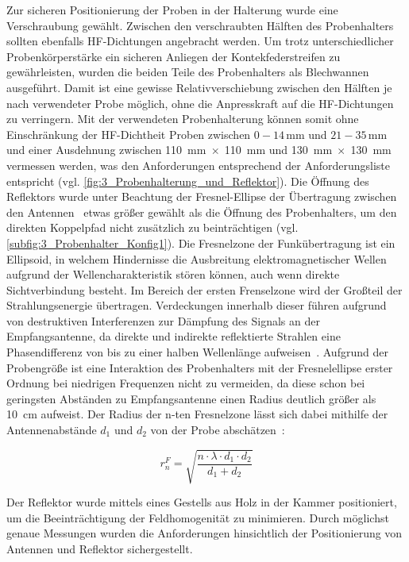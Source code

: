 Zur sicheren Positionierung der Proben in der Halterung wurde eine Verschraubung gewählt. Zwischen den verschraubten Hälften des Probenhalters sollten ebenfalls HF-Dichtungen angebracht werden. Um trotz unterschiedlicher Probenkörperstärke ein sicheren Anliegen der Kontekfederstreifen zu gewährleisten, wurden die beiden Teile des Probenhalters als Blechwannen ausgeführt. Damit ist eine gewisse Relativverschiebung zwischen den Hälften je nach verwendeter Probe möglich, ohne die Anpresskraft auf die HF-Dichtungen zu verringern. Mit der verwendeten Probenhalterung können somit ohne Einschränkung der HF-Dichtheit Proben zwischen $0-14\,\si{\milli\meter}$ und $21-35\,\si{\milli\meter}$ und einer Ausdehnung zwischen \SI{110}{\milli\meter}$\; \times \;$\SI{110}{\milli\meter} und \SI{130}{\milli\meter}$\; \times \;$\SI{130}{\milli\meter} vermessen werden, was den Anforderungen entsprechend der Anforderungsliste entspricht (vgl. \Abb\ref{fig:3_Probenhalterung_und_Reflektor}). Die Öffnung des Reflektors wurde unter Beachtung der Fresnel-Ellipse der Übertragung zwischen den Antennen~\cite{Taschenbuch_HF-Technik} etwas größer gewählt als die Öffnung des Probenhalters, um den direkten Koppelpfad nicht zusätzlich zu beinträchtigen (vgl. \Abb\ref{subfig:3_Probenhalter_Konfig1}). Die Fresnelzone der Funkübertragung ist ein Ellipsoid, in welchem Hindernisse die Ausbreitung elektromagnetischer Wellen aufgrund der Wellencharakteristik stören können, auch wenn direkte Sichtverbindung besteht. Im Bereich der ersten Frenselzone wird der Großteil der Strahlungsenergie übertragen. Verdeckungen innerhalb dieser führen aufgrund von destruktiven Interferenzen zur Dämpfung des Signals an der Empfangsantenne, da direkte und indirekte reflektierte Strahlen eine Phasendifferenz von bis zu einer halben Wellenlänge aufweisen~\cite{Advanced_Elecronic_Communication_Systems}. Aufgrund der Probengröße ist eine Interaktion des Probenhalters mit der Fresnelellipse erster Ordnung bei niedrigen Frequenzen nicht zu vermeiden, da diese schon bei geringsten Abständen zu Empfangsantenne einen Radius deutlich größer als \SI{10}{\centi\meter} aufweist. Der Radius der n-ten Fresnelzone lässt sich dabei mithilfe der Antennenabstände $d_1$ und $d_2$ von der Probe abschätzen~\cite{Taschenbuch_HF-Technik}:

\begin{equation}
    r^F_n = \sqrt{\frac{n\cdot \lambda\cdot d_1 \cdot d_2}{d_1 + d_2}}
    \label{Fresnelzone}
\end{equation}

\par
\vspace{\linespace}
Der Reflektor wurde mittels eines Gestells aus Holz in der Kammer positioniert, um die Beeinträchtigung der Feldhomogenität zu minimieren. Durch möglichst genaue Messungen wurden die Anforderungen hinsichtlich der Positionierung von Antennen und Reflektor sichergestellt.
\par
\vspace{\linespace}

